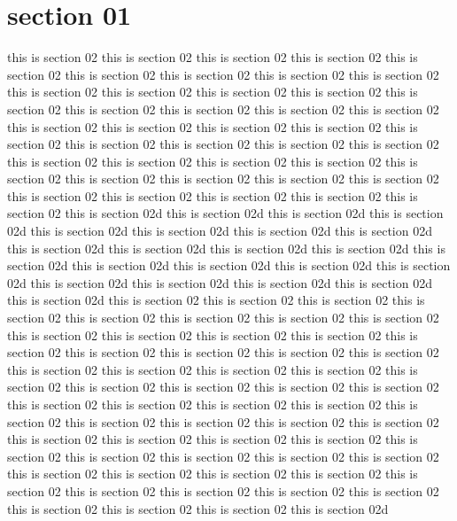 \section{section 01}
this is section 02
this is section 02
this is section 02
this is section 02
this is section 02
this is section 02
this is section 02
this is section 02
this is section 02
this is section 02
this is section 02
this is section 02
this is section 02
this is section 02
this is section 02
this is section 02
this is section 02
this is section 02
this is section 02
this is section 02
this is section 02
this is section 02
this is section 02
this is section 02
this is section 02
this is section 02
this is section 02
this is section 02
this is section 02
this is section 02
this is section 02
this is section 02
this is section 02
this is section 02
this is section 02
this is section 02
this is section 02
this is section 02
this is section 02
this is section 02
this is section 02
this is section 02d
this is section 02d
this is section 02d
this is section 02d
this is section 02d
this is section 02d
this is section 02d
this is section 02d
this is section 02d
this is section 02d
this is section 02d
this is section 02d
this is section 02d
this is section 02d
this is section 02d
this is section 02d
this is section 02d
this is section 02d
this is section 02d
this is section 02d
this is section 02d
this is section 02d
this is section 02
this is section 02
this is section 02
this is section 02
this is section 02
this is section 02
this is section 02
this is section 02
this is section 02
this is section 02
this is section 02
this is section 02
this is section 02
this is section 02
this is section 02
this is section 02
this is section 02
this is section 02
this is section 02
this is section 02
this is section 02
this is section 02
this is section 02
this is section 02
this is section 02
this is section 02
this is section 02
this is section 02
this is section 02
this is section 02
this is section 02
this is section 02
this is section 02
this is section 02
this is section 02
this is section 02
this is section 02
this is section 02
this is section 02
this is section 02
this is section 02
this is section 02
this is section 02
this is section 02
this is section 02
this is section 02
this is section 02
this is section 02
this is section 02
this is section 02
this is section 02
this is section 02
this is section 02
this is section 02
this is section 02
this is section 02
this is section 02d
